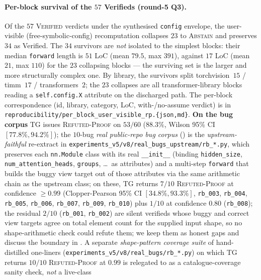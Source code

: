 \paragraph{Per-block survival of the $57$ Verifieds (round-5 Q3).}
Of the $57$ \textsc{Verified} verdicts under the synthesised
\texttt{config} envelope, the user-visible (free-symbolic-config)
recomputation collapses $23$ to \textsc{Abstain} and preserves $34$
as Verified.  The $34$ survivors are \emph{not} isolated to the
simplest blocks: their median \texttt{forward} length is $51$ LoC
(mean $79.5$, max $391$), against $17$ LoC (mean $21$, max $110$)
for the $23$ collapsing blocks --- the surviving set is the
larger and more structurally complex one.  By library, the
survivors split torchvision~$15$ / timm~$17$ / transformers~$2$;
the $23$ collapses are all transformer-library blocks reading a
\texttt{self.config.X} attribute on the discharged path.  The
per-block correspondence (id, library, category, LoC, with-/no-assume
verdict) is in
\texttt{reproducibility/per\_block\_user\_visible\_rp.\{json,md\}}.
\textbf{On the bug corpus} \textsc{TG} issues
\textsc{Refuted-Proof} on $53/60$ ($88.3\%$, Wilson 95\% CI
$[77.8\%, 94.2\%]$); the $10$-bug
\emph{real public-repo bug corpus} () is
the \emph{upstream-faithful} re-extract in
\texttt{experiments\_v5/v8/real\_bugs\_upstream/rb\_*.py}, which
preserves each \texttt{nn.Module} class with its real
\texttt{\_\_init\_\_} (binding \texttt{hidden\_size},
\texttt{num\_attention\_heads}, \texttt{groups}, \dots\ as
attributes) and a multi-step
\texttt{forward} that builds the buggy view target out of those
attributes via the same arithmetic chain as the upstream class;
on these, \textsc{TG} returns $7/10$
\textsc{Refuted-Proof} at confidence $\ge 0.99$
(Clopper-Pearson 95\% CI $[34.8\%, 93.3\%]$,
\texttt{rb\_003}, \texttt{rb\_004}, \texttt{rb\_005},
\texttt{rb\_006}, \texttt{rb\_007},
\texttt{rb\_009}, \texttt{rb\_010}) plus
$1/10$ at confidence $0.80$ (\texttt{rb\_008}); the residual
$2/10$ (\texttt{rb\_001}, \texttt{rb\_002}) are silent
verifieds whose buggy and correct view targets agree on
total element count for the supplied input shape, so no
shape-arithmetic check could refute them; we keep them as
honest gaps and discuss the boundary in .
A separate \emph{shape-pattern coverage suite} of hand-distilled
one-liners
(\texttt{experiments\_v5/v8/real\_bugs/rb\_*.py}) on which
\textsc{TG} returns $10/10$ \textsc{Refuted-Proof} at $0.99$ is
relegated to  as a
catalogue-coverage sanity check, \emph{not} a live-class
